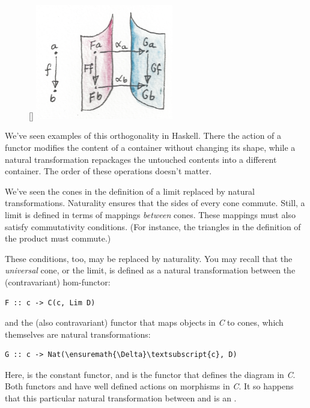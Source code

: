 \begin{figure}
\raisebox{0pt}[\dimexpr{}\baselineskip\relax]{
\includegraphics[width=60mm]{images/sheets.png}}%
\end{figure}

\noindent
We've seen examples of this orthogonality in Haskell. There the action
of a functor modifies the content of a container without changing its
shape, while a natural transformation repackages the untouched contents
into a different container. The order of these operations doesn't
matter.

We've seen the cones in the definition of a limit replaced by natural
transformations. Naturality ensures that the sides of every cone
commute. Still, a limit is defined in terms of mappings \emph{between}
cones. These mappings must also satisfy commutativity conditions. (For
instance, the triangles in the definition of the product must commute.)

These conditions, too, may be replaced by naturality. You may recall
that the \emph{universal} cone, or the limit, is defined as a natural
transformation between the (contravariant) hom-functor:

\begin{verbatim}
F :: c -> C(c, Lim D)
\end{verbatim}
and the (also contravariant) functor that maps objects in \emph{C} to
cones, which themselves are natural transformations:

\begin{Verbatim}[commandchars=\\\{\}]
G :: c -> Nat(\ensuremath{\Delta}\textsubscript{c}, D)
\end{Verbatim}
Here,  is the constant functor, and  is the functor
that defines the diagram in \emph{C}. Both functors  and
 have well defined actions on morphisms in \emph{C}. It so
happens that this particular natural transformation between 
and  is an .

